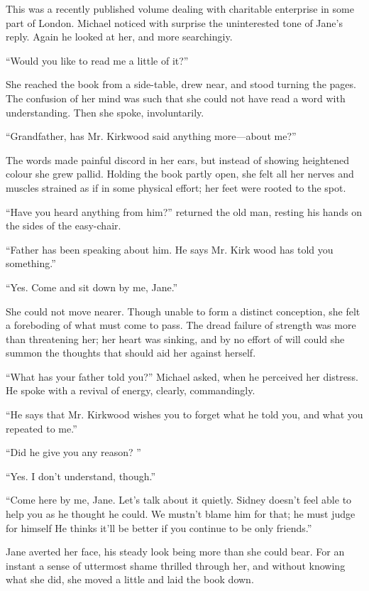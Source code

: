 This was a recently published volume dealing with charitable enterprise
in some part of London. Michael noticed with surprise the uninterested
tone of Jane's reply. Again he looked at her, and more searchingiy.

``Would you like to read me a little of it?''

She reached the book from a side-table, drew near, and stood turning the
pages. The confusion of her mind was such that she could not have read a
word with understanding. Then she spoke, involuntarily.

{\protect\hypertarget{130}{}{}}``Grandfather, has Mr. Kirkwood said
anything more---about me?''

The words made painful discord in her ears, but instead of showing
heightened colour she grew pallid. Holding the book partly open, she
felt all her nerves and muscles strained as if in some physical effort;
her feet were rooted to the spot.

``Have you heard anything from him?'' returned the old man, resting his
hands on the sides of the easy-chair.

``Father has been speaking about him. He says Mr. Kirk wood has told you
something.''

``Yes. Come and sit down by me, Jane.''

She could not move nearer. Though unable to form a distinct conception,
she felt a foreboding of what must come to pass. The dread failure of
strength was more than threatening her; her heart was sinking, and by no
effort of will could she summon the thoughts that should aid her against
herself.

``What has your father told you?'' Michael asked, when he perceived her
distress. He spoke with a revival of energy, clearly, commandingly.

``He says that Mr. Kirkwood wishes you to
{\protect\hypertarget{131}{}{}}forget what he told you, and what you
repeated to me.''

``Did he give you any reason? ''

``Yes. I don't understand, though.''

``Come here by me, Jane. Let's talk about it quietly. Sidney doesn't
feel able to help you as he thought he could. We mustn't blame him for
that; he must judge for himself He thinks it'll be better if you
continue to be only friends.''

Jane averted her face, his steady look being more than she could bear.
For an instant a sense of uttermost shame thrilled through her, and
without knowing what she did, she moved a little and laid the book down.

